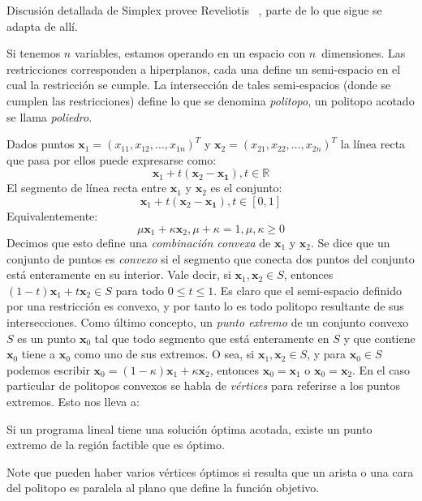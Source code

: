   Discusión detallada de Simplex provee Reveliotis~%
    \cite{reveliotis97:_intro_linear_progr_simplex_method},
  parte de lo que sigue se adapta de allí.

  Si tenemos \(n\) variables,
  estamos operando en un espacio con \(n\)~dimensiones.
  Las restricciones corresponden a hiperplanos,
  cada una define un semi-espacio en el cual la restricción se cumple.
  La intersección de tales semi-espacios
  (donde se cumplen las restricciones)
  define lo que se denomina \emph{politopo},
  un politopo acotado se llama \emph{poliedro}.

  Dados puntos \(\mathbf{x}_1 = (x_{1 1}, x_{1 2}, \dotsc, x_{1 n})^T\)
  y \(\mathbf{x}_2 = (x_{2 1}, x_{2 2}, \dotsc, x_{2 n})^T\)
  la línea recta que pasa por ellos puede expresarse como:
  \begin{equation*}
    \mathbf{x}_1 + t (\mathbf{x}_2 - \mathbf{x_1}),
    t \in \mathbb{R}
  \end{equation*}
  El segmento de línea recta entre \(\mathbf{x}_1\) y \(\mathbf{x}_2\)
  es el conjunto:
  \begin{equation*}
    \mathbf{x}_1 + t (\mathbf{x}_2 - \mathbf{x_1}),
    t \in [0, 1]
  \end{equation*}
  Equivalentemente:
  \begin{equation*}
    \mu \mathbf{x}_1 + \kappa \mathbf{x}_2,
    \mu + \kappa = 1,
    \mu, \kappa \ge 0
  \end{equation*}
  Decimos que esto define
  una \emph{combinación convexa} de \(\mathbf{x}_1\) y \(\mathbf{x}_2\).
  Se dice que un conjunto de puntos es \emph{convexo}
  si el segmento que conecta dos puntos del conjunto
  está enteramente en su interior.
  Vale decir,
  si \(\mathbf{x}_1, \mathbf{x}_2 \in S\),
  entonces \((1 - t) \mathbf{x}_1 + t \mathbf{x}_2 \in S\)
  para todo \(0 \le t \le 1\).
  Es claro que el semi-espacio definido por una restricción es convexo,
  y por tanto lo es todo politopo resultante de sus intersecciones.
  Como último concepto,
  un \emph{punto extremo} de un conjunto convexo \(S\)
  es un punto \(\mathbf{x}_0\)
  tal que todo segmento que está enteramente en \(S\)
  y que contiene \(\mathbf{x}_0\)
  tiene a \(\mathbf{x}_0\) como uno de sus extremos.
  O sea,
  si \(\mathbf{x}_1, \mathbf{x}_2 \in S\),
  y para \(\mathbf{x}_0 \in S\) podemos escribir
     \(\mathbf{x}_0 = (1 - \kappa) \mathbf{x}_1 + \kappa \mathbf{x}_2\),
  entonces \(\mathbf{x}_0 = \mathbf{x}_1\) o \(\mathbf{x}_0 = \mathbf{x}_2\).
  En el caso particular de politopos convexos
  se habla de \emph{vértices} para referirse a los puntos extremos.
  Esto nos lleva a:
  \begin{theorem}
    Si un programa lineal tiene una solución óptima acotada,
    existe un punto extremo de la región factible que es óptimo.
  \end{theorem}
  Note que pueden haber varios vértices óptimos
  si resulta que un arista o una cara del politopo
  es paralela al plano que define la función objetivo.

